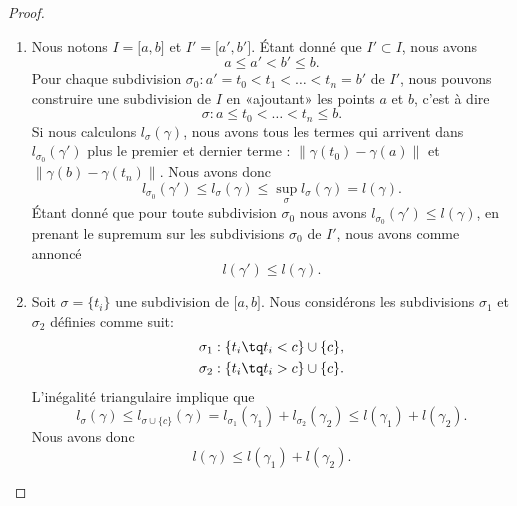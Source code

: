 \begin{proof}
    \begin{enumerate}
        \item
            Nous notons $I=\mathopen[ a , b \mathclose]$ et $I'=\mathopen[ a' , b' \mathclose]$. Étant donné que $I'\subset I$, nous avons
            \begin{equation}
                a\leq a'<b'\leq b.
            \end{equation}
            Pour chaque subdivision $\sigma_0:a'=t_0<t_1<\ldots<t_n=b'$ de $I'$, nous pouvons construire une subdivision de $I$ en «ajoutant» les points $a$ et $b$, c'est à dire
            \begin{equation}
                \sigma:a\leq t_0<\ldots<t_n\leq b.
            \end{equation}
            Si nous calculons $l_{\sigma}(\gamma)$, nous avons tous les termes qui arrivent dans $l_{\sigma_0}(\gamma')$ plus le premier et dernier terme : $\| \gamma(t_0)-\gamma(a) \|$ et $\| \gamma(b)-\gamma(t_n)\|$. Nous avons donc
            \begin{equation}
                l_{\sigma_0}(\gamma')\leq l_{\sigma}(\gamma)\leq\sup_{\sigma}l_{\sigma}(\gamma)=l(\gamma).
            \end{equation}
            Étant donné que pour toute subdivision $\sigma_0$ nous avons $l_{\sigma_0}(\gamma')\leq l(\gamma)$, en prenant le supremum sur les subdivisions $\sigma_0$ de $I'$, nous avons comme annoncé
            \begin{equation}
                l(\gamma')\leq l(\gamma).
            \end{equation}
        \item
            Soit $\sigma=\{ t_i \}$ une subdivision de $\mathopen[ a , b \mathclose]$. Nous considérons les subdivisions $\sigma_1$ et $\sigma_2$ définies comme suit:
            \begin{equation}
                \begin{aligned}[]
                    \sigma_1&:\{ t_i\tq t_i< c \}\cup\{ c \},\\
                    \sigma_2&:\{ t_i\tq t_i> c \}\cup\{ c \}.
                \end{aligned}
            \end{equation}
            L'inégalité triangulaire implique que
            \begin{equation}
                l_{\sigma}(\gamma)\leq l_{\sigma\cup\{ c \}}(\gamma)=l_{\sigma_1}(\gamma_1)+l_{\sigma_2}(\gamma_2)\leq l(\gamma_1)+l(\gamma_2).
            \end{equation}
            Nous avons donc
            \begin{equation}    \label{EqIneglglglgud}
                l(\gamma)\leq l(\gamma_1)+l(\gamma_2).
            \end{equation}


\end{enumerate}
\end{proof}

